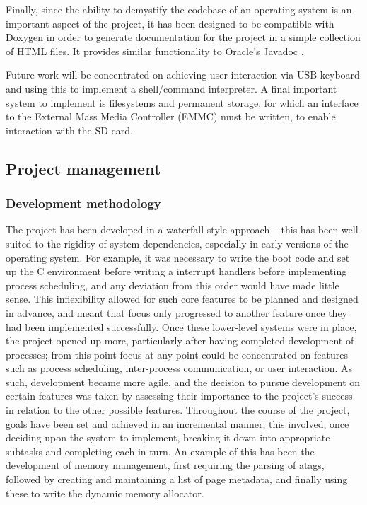     Finally, since the ability to demystify the codebase of an operating system
    is an important aspect of the project, it has been designed to be compatible
    with Doxygen \cite{Doxygen} in order to generate documentation for the
    project in a simple collection of HTML files. It provides similar
    functionality to Oracle's Javadoc \cite{Javadoc}.

    Future work will be concentrated on achieving user-interaction via USB
    keyboard and using this to implement a shell/command interpreter. A final
    important system to implement is filesystems and permanent storage, for
    which an interface to the External Mass Media Controller (EMMC) must be
    written, to enable interaction with the SD card.

\subsection{Project management}
    \subsubsection{Development methodology}
        The project has been developed in a waterfall-style approach -- this has
        been well-suited to the rigidity of system dependencies, especially in
        early versions of the operating system. For example, it was necessary to
        write the boot code and set up the C environment before writing a
        interrupt handlers before implementing process scheduling, and any
        deviation from this order would have made little sense. This
        inflexibility allowed for such core features to be planned and designed
        in advance, and meant that focus only progressed to another feature once
        they had been implemented successfully. Once these lower-level systems
        were in place, the project opened up more, particularly after having
        completed development of processes; from this point focus at any point
        could be concentrated on features such as process scheduling,
        inter-process communication, or user interaction. As such, development
        became more agile, and the decision to pursue development on certain
        features was taken by assessing their importance to the project's
        success in relation to the other possible features. Throughout the
        course of the project, goals have been set and achieved in an
        incremental manner; this involved, once deciding upon the system to
        implement, breaking it down into appropriate subtasks and completing
        each in turn. An example of this has been the development of memory
        management, first requiring the parsing of atags, followed by
        creating and maintaining a list of page metadata, and finally using
        these to write the dynamic memory allocator.

